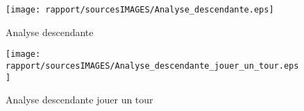 \begin{figure}[ht]
  \centering
  \texttt{[image: rapport/sourcesIMAGES/Analyse\_descendante.eps]}
  \caption{Analyse descendante}
  \texttt{[image: rapport/sourcesIMAGES/Analyse\_descendante\_jouer\_un\_tour.eps]}
  \caption{Analyse descendante jouer un tour}
\end{figure}
